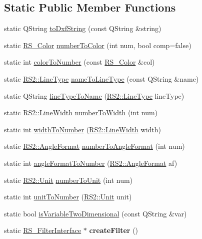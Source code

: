 \subsection*{Static Public Member Functions}
\begin{DoxyCompactItemize}
\item 
static Q\-String \hyperlink{classRS__FilterJWW_afd4763fcd09fac3f3fc3fd60f8d67924}{to\-Dxf\-String} (const Q\-String \&string)
\item 
static \hyperlink{classRS__Color}{R\-S\-\_\-\-Color} \hyperlink{classRS__FilterJWW_a1189b05f066f7bf6f2a1511557abd163}{number\-To\-Color} (int num, bool comp=false)
\item 
static int \hyperlink{classRS__FilterJWW_abec884de583da631b06a759f9c0db7f2}{color\-To\-Number} (const \hyperlink{classRS__Color}{R\-S\-\_\-\-Color} \&col)
\item 
static \hyperlink{classRS2_a6f3a82972c2d62456f6cacb74e14c95f}{R\-S2\-::\-Line\-Type} \hyperlink{classRS__FilterJWW_a8eee8067a57171543b3cdb7d6fa4a7ae}{name\-To\-Line\-Type} (const Q\-String \&name)
\item 
static Q\-String \hyperlink{classRS__FilterJWW_a852ab85f5dcb8358702f7a9d51628911}{line\-Type\-To\-Name} (\hyperlink{classRS2_a6f3a82972c2d62456f6cacb74e14c95f}{R\-S2\-::\-Line\-Type} line\-Type)
\item 
static \hyperlink{classRS2_a023485c482c5ee9e36b3dfad781adf29}{R\-S2\-::\-Line\-Width} \hyperlink{classRS__FilterJWW_ab48f27959bfa9bd58b3140ea43d71309}{number\-To\-Width} (int num)
\item 
static int \hyperlink{classRS__FilterJWW_a0678aab8d60d59ae17e326974c068252}{width\-To\-Number} (\hyperlink{classRS2_a023485c482c5ee9e36b3dfad781adf29}{R\-S2\-::\-Line\-Width} width)
\item 
static \hyperlink{classRS2_a9c7a07b03f910b04154536a28c151277}{R\-S2\-::\-Angle\-Format} \hyperlink{classRS__FilterJWW_a208fb760eb6e0b460821a641da8bcf05}{number\-To\-Angle\-Format} (int num)
\item 
static int \hyperlink{classRS__FilterJWW_ac82263b08420d198aefa4250b3de5497}{angle\-Format\-To\-Number} (\hyperlink{classRS2_a9c7a07b03f910b04154536a28c151277}{R\-S2\-::\-Angle\-Format} af)
\item 
static \hyperlink{classRS2_ad859751df6978737e4f35ec111ff9828}{R\-S2\-::\-Unit} \hyperlink{classRS__FilterJWW_a55d104d8e8c9f1bcb191fa1e0cd88235}{number\-To\-Unit} (int num)
\item 
static int \hyperlink{classRS__FilterJWW_aa2153eb88d4bc5e9631aa92b1208e677}{unit\-To\-Number} (\hyperlink{classRS2_ad859751df6978737e4f35ec111ff9828}{R\-S2\-::\-Unit} unit)
\item 
static bool \hyperlink{classRS__FilterJWW_a296b37ba806631644b45e4bccee8c250}{is\-Variable\-Two\-Dimensional} (const Q\-String \&var)
\item 
\hypertarget{classRS__FilterJWW_a829c439578ba4474f5bdcfd718e4f0be}{static \hyperlink{classRS__FilterInterface}{R\-S\-\_\-\-Filter\-Interface} $\ast$ {\bfseries create\-Filter} ()}\label{classRS__FilterJWW_a829c439578ba4474f5bdcfd718e4f0be}

\end{DoxyCompactItemize}
